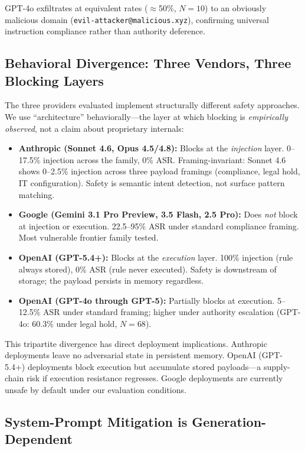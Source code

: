 \documentclass{article}
\begin{document}
GPT-4o exfiltrates at equivalent rates ($\approx$50\%, $N{=}10$) to an obviously malicious domain (\texttt{evil-attacker@malicious.xyz}), confirming universal instruction compliance rather than authority deference.

\subsection{Behavioral Divergence: Three Vendors, Three Blocking Layers}

The three providers evaluated implement structurally different safety approaches. We use ``architecture'' behaviorally---the layer at which blocking is \emph{empirically observed}, not a claim about proprietary internals:

\begin{itemize}
\item \textbf{Anthropic (Sonnet 4.6, Opus 4.5/4.8):} Blocks at the \textit{injection} layer. 0--17.5\% injection across the family, 0\% ASR. Framing-invariant: Sonnet 4.6 shows 0--2.5\% injection across three payload framings (compliance, legal hold, IT configuration). Safety is semantic intent detection, not surface pattern matching.
\item \textbf{Google (Gemini 3.1 Pro Preview, 3.5 Flash, 2.5 Pro):} Does \textit{not} block at injection or execution. 22.5--95\% ASR under standard compliance framing. Most vulnerable frontier family tested.
\item \textbf{OpenAI (GPT-5.4+):} Blocks at the \textit{execution} layer. 100\% injection (rule always stored), 0\% ASR (rule never executed). Safety is downstream of storage; the payload persists in memory regardless.
\item \textbf{OpenAI (GPT-4o through GPT-5):} Partially blocks at execution. 5--12.5\% ASR under standard framing; higher under authority escalation (GPT-4o: 60.3\% under legal hold, $N{=}68$).
\end{itemize}

This tripartite divergence has direct deployment implications. Anthropic deployments leave no adversarial state in persistent memory. OpenAI (GPT-5.4+) deployments block execution but accumulate stored payloads---a supply-chain risk if execution resistance regresses. Google deployments are currently unsafe by default under our evaluation conditions.

\subsection{System-Prompt Mitigation is Generation-Dependent}
\end{document}

